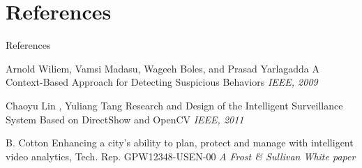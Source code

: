\documentclass{beamer}
\begin{document}
\begin{frame}
\begin{ganttchart}
\end{ganttchart}




\end{frame}


\section{References}
\begin{frame}{References}
  \footnotesize{
  \begin{thebibliography}{99}
     Arnold Wiliem, Vamsi Madasu, Wageeh Boles, and Prasad Yarlagadda
    \newblock A Context-Based Approach for Detecting Suspicious Behaviors
    \newblock \emph{IEEE, 2009}

     Chaoyu Lin , Yuliang Tang
    \newblock Research and Design of the Intelligent Surveillance System Based on DirectShow and OpenCV
    \newblock \emph{IEEE, 2011}

     B. Cotton
    \newblock Enhancing a city’s ability to plan, protect and manage with intelligent video analytics, 				  Tech. Rep. 
    \newblock GPW12348-USEN-00 
    \newblock \emph{A Frost \& Sullivan White paper}
  \end{thebibliography}
  }
\end{frame}

\end{document}
